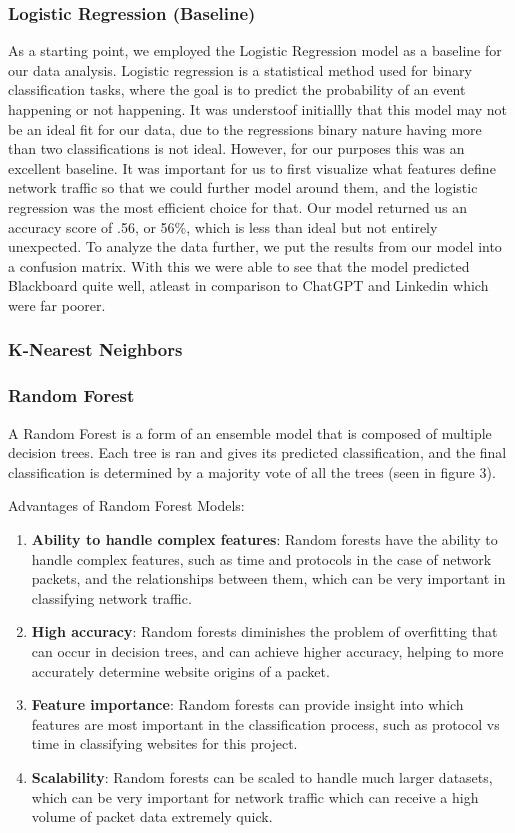 \documentclass[10pt,sigconf,letterpaper,nonacm]{acmart}
\begin{document}
\subsubsection{Logistic Regression (Baseline)}
As a starting point, we employed the Logistic Regression model as a baseline for our data analysis. Logistic regression is a statistical method used for binary classification tasks, where the goal is to predict the probability of an event happening or not happening.
It was understoof initiallly that this model may not be an ideal fit for our data, due to the regressions binary nature having more than two classifications is not ideal.
However, for our purposes this was an excellent baseline. It was important for us to first visualize what features define network traffic so that we could further model around them, and the logistic regression was the most efficient choice for that.
Our model returned us an accuracy score of .56, or 56\%, which is less than ideal but not entirely unexpected.
To analyze the data further, we put the results from our model into a confusion matrix. With this we were able to see that the model predicted Blackboard quite well, atleast in comparison to ChatGPT and Linkedin which were far poorer.


\subsubsection{K-Nearest Neighbors}

\subsubsection{Random Forest}
A Random Forest is a form of an ensemble model that is composed of multiple decision trees. Each tree is ran and gives its predicted classification, and the final classification is determined by a majority vote of all the trees (seen in figure 3).

Advantages of Random Forest Models:
\begin{enumerate}
  \item \textbf{Ability to handle complex features}: Random forests have the ability to handle complex features, such as time and protocols in the case of network packets, and the relationships between them, which can be very important in classifying network traffic.
  \item \textbf{High accuracy}: Random forests diminishes the problem of overfitting that can occur in decision trees, and can achieve higher accuracy, helping to more accurately determine website origins of a packet.
  \item \textbf{Feature importance}: Random forests can provide insight into which features are most important in the classification process, such as protocol vs time in classifying websites for this project.
  \item \textbf{Scalability}: Random forests can be scaled to handle much larger datasets, which can be very important for network traffic which can receive a high volume of packet data extremely quick.
\end{enumerate}
\end{document}
